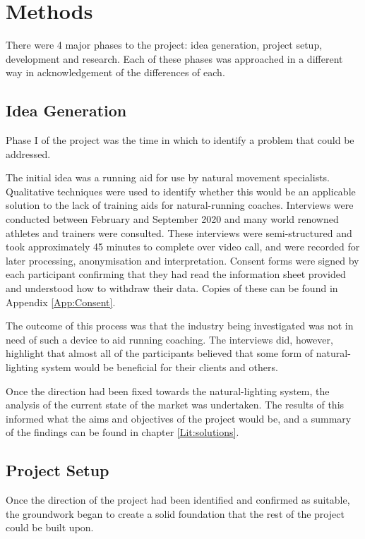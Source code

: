
\chapter{Methods}
\label{Chap:Meth}

There were 4 major phases to the project: idea generation, project setup, development and research. Each of these phases was approached in a different way in acknowledgement of the differences of each.

\section{Idea Generation}

Phase I of the project was the time in which to identify a problem that could be addressed. 

The initial idea was a running aid for use by natural movement specialists. Qualitative techniques were used to identify whether this would be an applicable solution to the lack of training aids for natural-running coaches. Interviews were conducted between February and September 2020 and many world renowned athletes and trainers were consulted. These interviews were semi-structured and took approximately 45 minutes to complete over video call, and were recorded for later processing, anonymisation and interpretation. Consent forms were signed by each participant confirming that they had read the information sheet provided and understood how to withdraw their data. Copies of these can be found in Appendix \ref{App:Consent}.

The outcome of this process was that the industry being investigated was not in need of such a device to aid running coaching. The interviews did, however, highlight that almost all of the participants believed that some form of natural-lighting system would be beneficial for their clients and others.

Once the direction had been fixed towards the natural-lighting system, the analysis of the current state of the market was undertaken. The results of this informed what the aims and objectives of the project would be, and a summary of the findings can be found in chapter \ref{Lit:solutions}.

\section{Project Setup}

Once the direction of the project had been identified and confirmed as suitable, the groundwork began to create a solid foundation that the rest of the project could be built upon.

